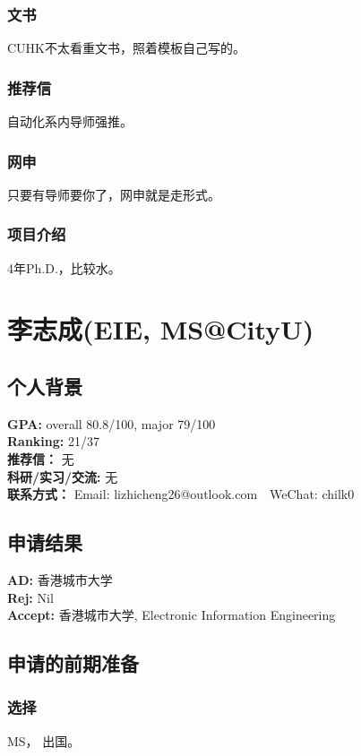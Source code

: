 \documentclass[a4paper,UTF8]{book}
\begin{document}
        \subsubsection*{文书}
        CUHK不太看重文书，照着模板自己写的。

        \subsubsection*{推荐信}
        自动化系内导师强推。

        \subsubsection*{网申}
        只要有导师要你了，网申就是走形式。

        \subsubsection*{项目介绍}
        4年Ph.D.，比较水。


\clearpage
\section{李志成(EIE, MS@CityU)}
    \subsection*{个人背景}
        \textbf{GPA:} overall 80.8/100, major 79/100\\
        \textbf{Ranking:} 21/37\\
        \textbf{推荐信：} 无\\
        \textbf{科研/实习/交流:} 无\\ 
        \textbf{联系方式：} Email: lizhicheng26@outlook.com$\quad$WeChat: chilk0

    \subsection*{申请结果}
        \textbf{AD:} 香港城市大学\\
        \textbf{Rej:} Nil\\
        \textbf{Accept:} 香港城市大学, Electronic Information Engineering

    \subsection*{申请的前期准备}
        \subsubsection*{选择}
        MS， 出国。
\end{document}
